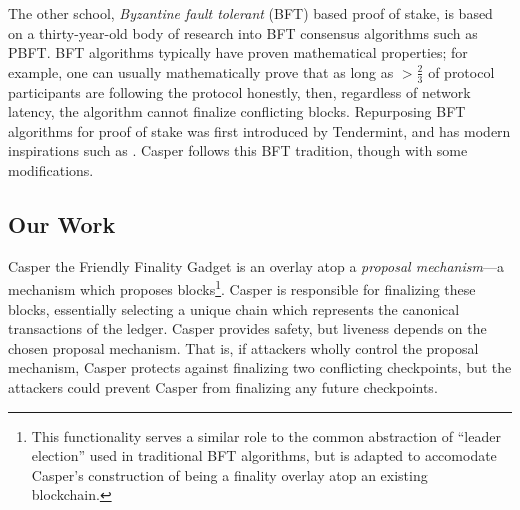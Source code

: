 \documentclass[12pt]{article}
\begin{document}
The other school, \textit{Byzantine fault tolerant} (BFT) based proof of stake, is based on a thirty-year-old body of research into BFT consensus algorithms such as PBFT\cite{castro1999practical}. BFT algorithms typically have proven mathematical properties; for example, one can usually mathematically prove that as long as $>\!\frac{2}{3}$ of protocol participants are following the protocol honestly, then, regardless of network latency, the algorithm cannot finalize conflicting blocks.  Repurposing BFT algorithms for proof of stake was first introduced by Tendermint\cite{kwon2014tendermint}, and has modern inspirations such as \cite{algorand}.  Casper follows this BFT tradition, though with some modifications.

\subsection{Our Work}
Casper the Friendly Finality Gadget is an overlay atop a \emph{proposal mechanism}---a mechanism which proposes blocks\footnote{This functionality serves a similar role to the common abstraction of ``leader election'' used in traditional BFT algorithms, but is adapted to accomodate Casper's construction of being a finality overlay atop an existing blockchain.}.  Casper is responsible for finalizing these blocks, essentially selecting a
unique chain which represents the canonical transactions of the ledger.  Casper provides safety, but liveness depends on the chosen proposal mechanism.  That is, if attackers wholly control the proposal mechanism, Casper protects against finalizing two conflicting checkpoints, but the attackers could prevent Casper from finalizing any future checkpoints.
\end{document}

